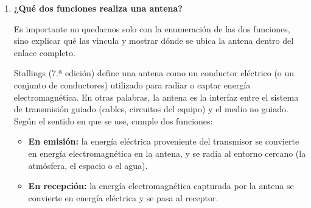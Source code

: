 \documentclass[11pt,a4paper]{article}
\begin{document}
\begin{enumerate}[label=4.\arabic*), itemsep=0.3cm]
        Por el lado de las dificultades, cada una sufre más de un tipo de defecto distinto. Las microondas se ven mucho más afectadas por la atenuación debida a la lluvia, sobre todo por encima de los 10 GHz, mientras que las ondas de radio son comparativamente menos sensibles a ese fenómeno. A cambio, las ondas de radio son más propensas a sufrir interferencias por multitrayectoria: como no van tan enfocadas, al receptor le llegan reflejos de la señal original con distintos retardos (el ejemplo clásico es el ``fantasma'' que aparece en la imagen de un televisor cuando pasa un avión cerca), algo que en un enlace de microondas bien alineado es mucho menos frecuente porque casi toda la energía viaja concentrada en el haz directo.
  \item
        \textbf{¿Qué dos funciones realiza una antena?}
        
        Es importante no quedarnos solo con la enumeración de las dos funciones, sino explicar qué las vincula y mostrar dónde se ubica la antena dentro del enlace completo.

        Stallings (7.ª edición) define una antena como un conductor eléctrico (o un conjunto de conductores) utilizado para radiar o captar energía electromagnética. En otras palabras, la antena es la interfaz entre el sistema de transmisión guiado (cables, circuitos del equipo) y el medio no guiado. Según el sentido en que se use, cumple dos funciones:

        \begin{itemize}
          \item \textbf{En emisión:} la energía eléctrica proveniente del transmisor se convierte en energía electromagnética en la antena, y se radia al entorno cercano (la atmósfera, el espacio o el agua).
          \item \textbf{En recepción:} la energía electromagnética capturada por la antena se convierte en energía eléctrica y se pasa al receptor.
        \end{itemize}

        \begin{figure}[h]
          \centering
\end{figure}
\end{enumerate}
\end{document}
